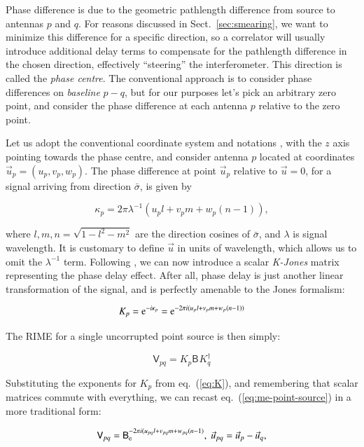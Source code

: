 \documentclass[]{aa}
\newcommand{\coh}[2]{\mathsf{{#1}}_{{#2}}}
\begin{document}
Phase difference is due to the geometric pathlength difference from source to antennas $p$ and $q$. For reasons discussed in Sect.~\ref{sec:smearing}, we want to minimize this difference for a specific direction, so a correlator will usually introduce additional delay terms to compensate for the pathlength difference in the chosen direction, effectively ``steering'' the interferometer. This direction is called the {\em phase centre}. The conventional approach is to consider phase differences on {\em baseline} $p-q$, but for our purposes let's pick an arbitrary zero point, and consider the phase difference at each antenna $p$ relative to the zero point.

Let us adopt the conventional coordinate system and notations \citep[see e.g.][]{tms}, with the $z$ axis pointing towards the phase centre, and consider antenna $p$ located at coordinates $\vec u_p=(u_p,v_p,w_p)$. The phase difference at point $\vec u_p$ relative to $\vec u=0$, for a signal arriving from direction $\bar \sigma$, is given by

  \[
  \kappa_p = 2\pi\lambda^{-1}(u_p l+v_p m+w_p (n-1)),
  \]

where $l,m,n=\sqrt{1-l^2-m^2}$ are the direction cosines of $\bar\sigma$, and $\lambda$ is signal wavelength. It is customary to define $\vec u$ in units of wavelength, which allows us to omit the $\lambda^{-1}$ term.
Following \citet{JEN:note185}, we can now introduce a scalar {\em K-Jones} matrix representing the phase delay effect. After all, phase delay is just another linear transformation of the signal, and is perfectly amenable to the Jones formalism:

  \begin{equation}\label{eq:K}
  K_p = {\rm e}^{-i\kappa_p} = {\rm e}^{-2\pi i(u_p l+v_p m+w_p (n-1))}
  \end{equation}

The RIME for a single uncorrupted point source is then simply:

  \begin{equation}\label{eq:me-point-source}
  \coh{V}{pq} = K_p \coh{B}{}  K^\dagger_q
  \end{equation}

Substituting the exponents for $K_p$ from eq.~(\ref{eq:K}), and remembering that scalar matrices commute with everything, we can recast eq.~(\ref{eq:me-point-source}) in a more traditional form:

  \begin{equation}\label{eq:me-point-source-uvw}
  \coh{V}{pq} = \coh{B}  {\rm e}^{-2\pi i(u_{pq} l+v_{pq} m+w_{pq} (n-1)},\;\vec u_{pq} = \vec u_p - \vec u_q,
  \end{equation}
 
\end{document}
